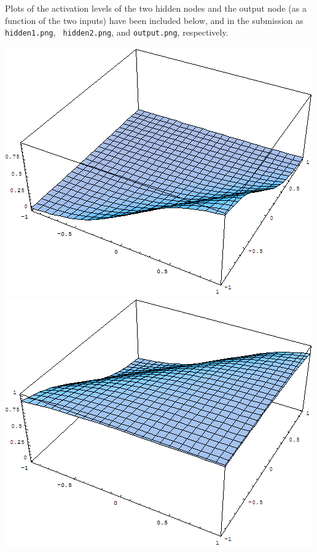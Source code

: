 \documentclass{article}
\begin{document}
\begin{enumerate}
    Plots of the activation levels of the two hidden nodes and the
    output node (as a function of the two inputs) have been included
    below, and in the submission as {\tt hidden1.png}, {\tt
      hidden2.png}, and {\tt output.png}, respectively.

    \begin{center}
      \includegraphics[scale=.35]{hidden1.png}
      \includegraphics[scale=.35]{hidden2.png}

\end{center}
\end{enumerate}
\end{document}
